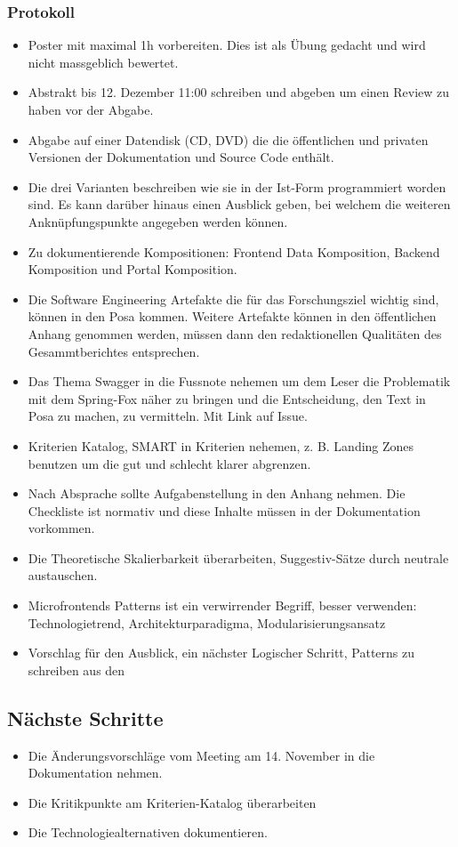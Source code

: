 \documentclass{article}
\begin{document}
\subsubsection{Protokoll}
\begin{itemize}
    \item Poster mit maximal 1h vorbereiten. Dies ist als Übung gedacht und wird nicht massgeblich bewertet.
    \item Abstrakt bis 12. Dezember 11:00 schreiben und abgeben um einen Review zu haben vor der Abgabe.
    \item Abgabe auf einer Datendisk (CD, DVD) die die öffentlichen und privaten Versionen der Dokumentation und Source Code enthält.
    \item Die drei Varianten beschreiben wie sie in der Ist-Form programmiert worden sind. Es kann darüber hinaus einen Ausblick geben, bei welchem die weiteren Anknüpfungspunkte angegeben werden können.
    \item Zu dokumentierende Kompositionen: Frontend Data Komposition, Backend Komposition und Portal Komposition.
    \item Die Software Engineering Artefakte die für das Forschungsziel wichtig sind, können in den Posa kommen. Weitere Artefakte können in den öffentlichen Anhang genommen werden, müssen dann den redaktionellen Qualitäten des Gesammtberichtes entsprechen.
    \item Das Thema Swagger in die Fussnote nehemen um dem Leser die Problematik mit dem Spring-Fox näher zu bringen und die Entscheidung, den Text in Posa zu machen, zu vermitteln. Mit Link auf Issue.
    \item Kriterien Katalog, SMART in Kriterien nehemen, z. B. Landing Zones benutzen um die gut und schlecht klarer abgrenzen.
    \item Nach Absprache sollte Aufgabenstellung in den Anhang nehmen. Die Checkliste ist normativ und diese Inhalte müssen in der Dokumentation vorkommen.
    \item Die Theoretische Skalierbarkeit überarbeiten, Suggestiv-Sätze durch neutrale austauschen.
    \item Microfrontends Patterns ist ein verwirrender Begriff, besser verwenden: Technologietrend, Architekturparadigma, Modularisierungsansatz
    \item Vorschlag für den Ausblick, ein nächster Logischer Schritt, Patterns zu schreiben aus den 
\end{itemize}
\subsection{Nächste Schritte}
\begin{itemize}
    \item Die Änderungsvorschläge vom Meeting am 14. November in die Dokumentation nehmen.
    \item Die Kritikpunkte am Kriterien-Katalog überarbeiten
    \item Die Technologiealternativen dokumentieren.
\end{itemize}
\end{document}
